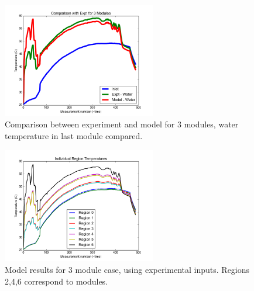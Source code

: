 \documentclass[11pt]{article}
\begin{document}
\begin{figure}[!ht]
\centering
\includegraphics[width=0.6\textwidth]{nov25.png}
\caption{Comparison between experiment and model for 3 modules, water temperature in last module compared.}
\end{figure}
\begin{figure}[!ht]
\centering
\includegraphics[width=0.6\textwidth]{nov25modules.png}
\caption{Model results for 3 module case, using experimental inputs. Regions 2,4,6 correspond to modules.}
\end{figure}
\end{document}
